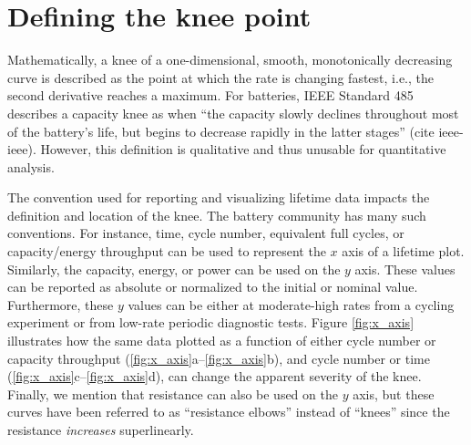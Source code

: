 \documentclass[journal=jpclcd,manuscript=article]{achemso}
\newcommand{\cmark}{\textcolor{blue}{\textrm{\ding{52}}}}%
\newcommand{\pbox}[1]{{
\fbox{
\parbox{0.8\textwidth}{  \fbox{$\triangleright$\textcolor{blue}{\textbf{Peter}:}} 
#1
}}}}
\begin{document}
\section{Defining the knee point}
\label{sec:defining-knee-points}

Mathematically, a knee of a one-dimensional, smooth, monotonically decreasing curve is described as the point at which the rate is changing fastest, i.e., the second derivative reaches a maximum. For batteries, IEEE Standard 485 describes a capacity knee as when ``the capacity slowly declines throughout
most of the battery’s life, but begins to decrease rapidly in the latter stages'' (cite ieee-ieee). However, this definition is qualitative and thus unusable for quantitative analysis.

The convention used for reporting and visualizing lifetime data impacts the definition and location of the knee. The battery community has many such conventions. For instance, time, cycle number, equivalent full cycles, or capacity/energy throughput can be used to represent the $x$ axis of a lifetime plot. Similarly, the capacity, energy, or power can be used on the $y$ axis. These values can be reported as absolute or normalized to the initial or nominal value. Furthermore, these $y$ values can be either at moderate-high rates from a cycling experiment or from low-rate periodic diagnostic tests. Figure \ref{fig:x_axis} illustrates how the same data plotted as a function of either cycle number or capacity throughput (\ref{fig:x_axis}a--\ref{fig:x_axis}b), and cycle number or time (\ref{fig:x_axis}c--\ref{fig:x_axis}d), can change the apparent severity of the knee.
Finally, we mention that resistance can also be used on the $y$ axis, but these curves have been referred to as ``resistance elbows'' instead of ``knees'' since the resistance \textit{increases} superlinearly.\cite{strange_elbows_2021}
\end{document}
